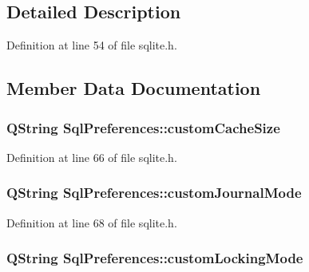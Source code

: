 \subsection{\-Detailed \-Description}


\-Definition at line 54 of file sqlite.\-h.



\subsection{\-Member \-Data \-Documentation}
\hypertarget{structSqlPreferences_a623f8f8b12bdde7ce2c69f6388d3719b}{
\subsubsection[{custom\-Cache\-Size}]{\setlength{\rightskip}{0pt plus 5cm}\-Q\-String {\bf \-Sql\-Preferences\-::custom\-Cache\-Size}}}\label{structSqlPreferences_a623f8f8b12bdde7ce2c69f6388d3719b}


\-Definition at line 66 of file sqlite.\-h.

\hypertarget{structSqlPreferences_afa1cee8e11c7ca38d32e05c92a6b56da}{
\subsubsection[{custom\-Journal\-Mode}]{\setlength{\rightskip}{0pt plus 5cm}\-Q\-String {\bf \-Sql\-Preferences\-::custom\-Journal\-Mode}}}\label{structSqlPreferences_afa1cee8e11c7ca38d32e05c92a6b56da}


\-Definition at line 68 of file sqlite.\-h.

\hypertarget{structSqlPreferences_ad99a3e0cc0c19283aa9337e6a28f0a28}{
\subsubsection[{custom\-Locking\-Mode}]{\setlength{\rightskip}{0pt plus 5cm}\-Q\-String {\bf \-Sql\-Preferences\-::custom\-Locking\-Mode}}}\label{structSqlPreferences_ad99a3e0cc0c19283aa9337e6a28f0a28}



